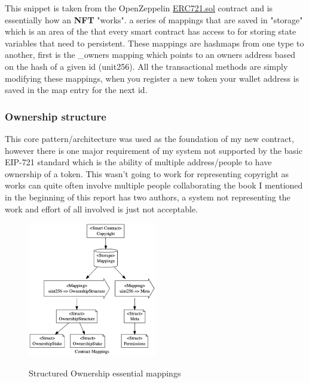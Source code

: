 This snippet is taken from the OpenZeppelin \href{https://github.com/OpenZeppelin/openzeppelin-contracts/blob/master/contracts/token/ERC721/ERC721.sol}{ERC721.sol} contract and is essentially how an \textbf{NFT} "works". a series of mappings that are saved in "storage" which is an area of the  that every smart contract has access to for storing state variables that need to persistent. These mappings are hashmaps from one type to another, first is the \_owners mapping which points to an owners address based on the hash of a given id (unit256). All the transactional methods are simply modifying these mappings, when you register a new token your wallet address is saved in the map entry for the next id.

\subsubsection{Ownership structure}

This core pattern/architecture was used as the foundation of my new contract, however there is one major requirement of my system not supported by the basic EIP-721 standard which is the ability of multiple address/people to have ownership of a token. This wasn't going to work for representing copyright as works can quite often involve multiple people collaborating the book I mentioned in the beginning of this report\cite{blockchain_revolution} has two authors, a system not representing the work and effort of all involved is just not acceptable.

\begin{figure}[H]
\caption{Structured Ownership essential mappings}
\centering
\includegraphics[width=0.5\textwidth,height=0.5\textheight,keepaspectratio]{images/operational/mappings.png}
\label{fig:float}
\end{figure}

